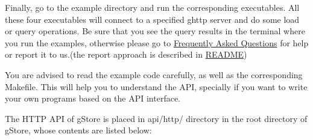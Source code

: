 \documentclass[titlepage, a4paper, 12pt]{article}
\begin{document}
Finally, go to the example directory and run the corresponding executables. All these four executables will connect to a specified ghttp server and do some load or query operations. Be sure that you see the query results in the terminal where you run the examples, otherwise please go to \hyperref[chapter11]{Frequently Asked Questions} for help or report it to us.(the report approach is described in \hyperref[chapter00]{README})

You are advised to read the example code carefully, as well as the corresponding Makefile. This will help you to understand the API, specially if you want to write your own programs based on the API interface.


The HTTP API of gStore is placed in api/http/ directory in the root directory of gStore, whose contents are listed below:
\end{document}

